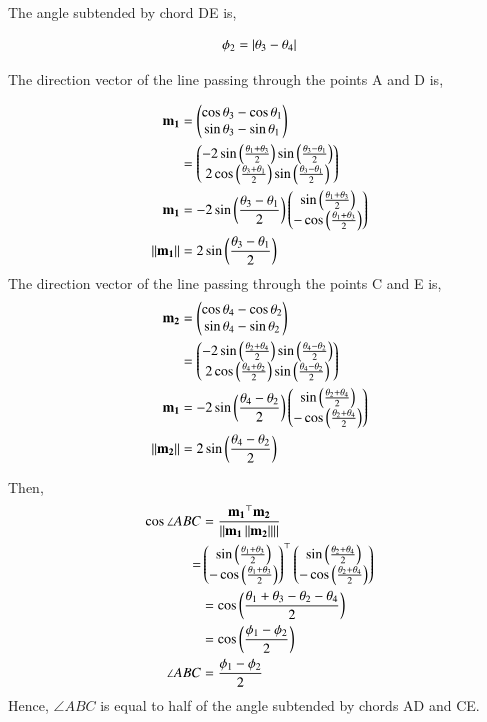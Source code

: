 \documentclass[journal,12pt,twocolumn]{IEEEtran}
\begin{document}
\begin{enumerate}
The angle subtended by chord DE is,

		\begin{align}
			\phi_2 = \left\vert\theta_3-\theta_4\right\vert
		\end{align}

The direction vector of the line passing through the points A and D is,

		\begin{align}
			\mathbf{m_1}&=\begin{pmatrix}\cos \theta_3-\cos \theta_1 \\ \sin \theta_3-\sin \theta_1\end{pmatrix}\\
			       &=\begin{pmatrix}-2\sin \left(\frac{\theta_1+\theta_3}{2}\right)\sin \left(\frac{\theta_3-\theta_1}{2}\right) \\ 2\cos \left(\frac{\theta_3+\theta_1}{2}\right) \sin \left(\frac{\theta_3-\theta_1}{2}\right)\end{pmatrix}\\
			\mathbf{m_1} &= -2\sin \left(\frac{\theta_3-\theta_1}{2}\right)\begin{pmatrix}\sin \left(\frac{\theta_1+\theta_3}{2}\right)\\-\cos \left(\frac{\theta_1+\theta_3}{2}\right)\end{pmatrix}\\ 
		\left\lVert\mathbf{m_1}\right\rVert &= 2\sin \left(\frac{\theta_3-\theta_1}{2}\right)
		\end{align}
The direction vector of the line passing through the points C and E is,
		\begin{align}
			\mathbf{m_2}&=\begin{pmatrix}\cos \theta_4-\cos \theta_2 \\ \sin \theta_4-\sin \theta_2\end{pmatrix}\\
			       &=\begin{pmatrix}-2\sin \left(\frac{\theta_2+\theta_4}{2}\right)\sin \left(\frac{\theta_4-\theta_2}{2}\right) \\ 2\cos \left(\frac{\theta_4+\theta_2}{2}\right) \sin \left(\frac{\theta_4-\theta_2}{2}\right)\end{pmatrix}\\
			\mathbf{m_1} &= -2\sin \left(\frac{\theta_4-\theta_2}{2}\right)\begin{pmatrix}\sin \left(\frac{\theta_2+\theta_4}{2}\right)\\-\cos \left(\frac{\theta_2+\theta_4}{2}\right)\end{pmatrix}\\ 
			\left\lVert\mathbf{m_2}\right\rVert&= 2\sin \left(\frac{\theta_4-\theta_2}{2}\right)
		\end{align}

Then,
		\begin{align}
			\cos \angle ABC &= \frac{\mathbf{m_1}^{\top}\mathbf{m_2}}{\left\lVert\mathbf{m_1}\left\lVert\mathbf{m_2}\right\rVert\right\rVert}\\
					= &\begin{pmatrix}\sin \left(\frac{\theta_1+\theta_3}{2}\right) \\ -\cos \left(\frac{\theta_1+\theta_3}{2}\right)\end{pmatrix}^{\top} \begin{pmatrix}\sin \left(\frac{\theta_2+\theta_4}{2}\right) \\ -\cos \left(\frac{\theta_2+\theta_4}{2}\right) \end{pmatrix}\\								
					&= \cos \left(\frac{\theta_1+\theta_3-\theta_2-\theta_4}{2}\right)\\
					&= \cos \left(\frac{\phi_1-\phi_2}{2}\right)\\
			     \angle ABC &= \frac{\phi_1-\phi_2}{2}
		\end{align}	
Hence, $\angle ABC$ is equal to half of the angle subtended by chords AD and CE.


\end{enumerate}
\end{document}

